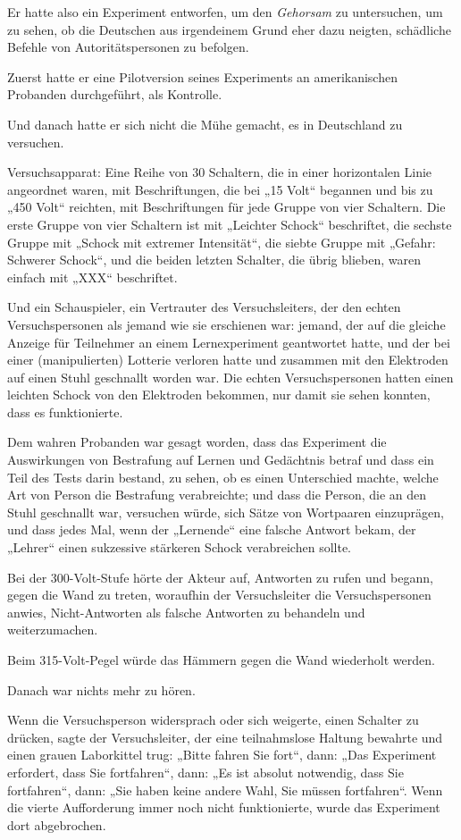 {Er hatte also ein Experiment entworfen, um den \emph{Gehorsam} zu untersuchen, um zu sehen, ob die Deutschen aus irgendeinem Grund eher dazu neigten, schädliche Befehle von Autoritätspersonen zu befolgen.

Zuerst hatte er eine Pilotversion seines Experiments an amerikanischen Probanden durchgeführt, als Kontrolle.

Und danach hatte er sich nicht die Mühe gemacht, es in Deutschland zu versuchen.

Versuchsapparat: Eine Reihe von 30 Schaltern, die in einer horizontalen Linie angeordnet waren, mit Beschriftungen, die bei „15 Volt“ begannen und bis zu „450 Volt“ reichten, mit Beschriftungen für jede Gruppe von vier Schaltern. Die erste Gruppe von vier Schaltern ist mit „Leichter Schock“ beschriftet, die sechste Gruppe mit „Schock mit extremer Intensität“, die siebte Gruppe mit „Gefahr: Schwerer Schock“, und die beiden letzten Schalter, die übrig blieben, waren einfach mit „XXX“ beschriftet.

Und ein Schauspieler, ein Vertrauter des Versuchsleiters, der den echten Versuchspersonen als jemand wie sie erschienen war: jemand, der auf die gleiche Anzeige für Teilnehmer an einem Lernexperiment geantwortet hatte, und der bei einer (manipulierten) Lotterie verloren hatte und zusammen mit den Elektroden auf einen Stuhl geschnallt worden war. Die echten Versuchspersonen hatten einen leichten Schock von den Elektroden bekommen, nur damit sie sehen konnten, dass es funktionierte.

Dem wahren Probanden war gesagt worden, dass das Experiment die Auswirkungen von Bestrafung auf Lernen und Gedächtnis betraf und dass ein Teil des Tests darin bestand, zu sehen, ob es einen Unterschied machte, welche Art von Person die Bestrafung verabreichte; und dass die Person, die an den Stuhl geschnallt war, versuchen würde, sich Sätze von Wortpaaren einzuprägen, und dass jedes Mal, wenn der „Lernende“ eine falsche Antwort bekam, der „Lehrer“ einen sukzessive stärkeren Schock verabreichen sollte.

Bei der 300-Volt-Stufe hörte der Akteur auf, Antworten zu rufen und begann, gegen die Wand zu treten, woraufhin der Versuchsleiter die Versuchspersonen anwies, Nicht-Antworten als falsche Antworten zu behandeln und weiterzumachen.

Beim 315-Volt-Pegel würde das Hämmern gegen die Wand wiederholt werden.

Danach war nichts mehr zu hören.

Wenn die Versuchsperson widersprach oder sich weigerte, einen Schalter zu drücken, sagte der Versuchsleiter, der eine teilnahmslose Haltung bewahrte und einen grauen Laborkittel trug: „Bitte fahren Sie fort“, dann: „Das Experiment erfordert, dass Sie fortfahren“, dann: „Es ist absolut notwendig, dass Sie fortfahren“, dann: „Sie haben keine andere Wahl, Sie müssen fortfahren“. Wenn die vierte Aufforderung immer noch nicht funktionierte, wurde das Experiment dort abgebrochen.

}
